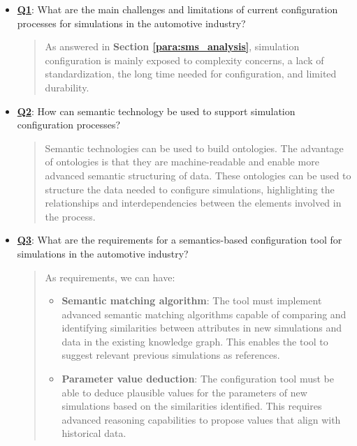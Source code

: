 \begin{itemize}
    \item \hyperref[Q1]{\textbf{Q1}}: What are the main challenges and limitations of current configuration processes for simulations in the automotive industry?
    \begin{quote}
        As answered in \textbf{Section \ref{para:sms_analysis}}, simulation configuration is mainly exposed to complexity concerns, a lack of standardization, the long time needed for configuration, and limited durability.\\
    \end{quote}

    \item \hyperref[Q2]{\textbf{Q2}}: How can semantic technology be used to support simulation configuration processes?
    \begin{quote}
        Semantic technologies can be used to build ontologies. The advantage of ontologies is that they are machine-readable and enable more advanced semantic structuring of data. These ontologies can be used to structure the data needed to configure simulations, highlighting the relationships and interdependencies between the elements involved in the process.\\
    \end{quote}
    
    \item \hyperref[Q3]{\textbf{Q3}}: What are the requirements for a semantics-based configuration tool for simulations in the automotive industry?
    \begin{quote}
        As requirements, we can have:
        
        \begin{itemize}
            \item \textbf{Semantic matching algorithm}: The tool must implement advanced semantic matching algorithms capable of comparing and identifying similarities between attributes in new simulations and data in the existing knowledge graph. This enables the tool to suggest relevant previous simulations as references.\\
            
            \item \textbf{Parameter value deduction}: The configuration tool must be able to deduce plausible values for the parameters of new simulations based on the similarities identified. This requires advanced reasoning capabilities to propose values that align with historical data.\\
            

\end{itemize}
\end{quote}
\end{itemize}
